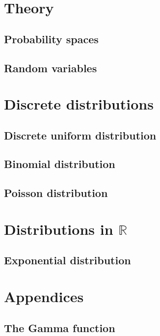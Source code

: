 \documentclass[12pt]{book}
\theoremstyle{plain}
\theoremstyle{definition}
\theoremstyle{remark}
\newcommand{\R}{\mathbb{R}} %
\begin{document}
	\tableofcontents
	
	\part{Theory}

	\chapter{Probability spaces}
	
	
	\chapter{Random variables}
	
	
	\part{Discrete distributions}

	\chapter{Discrete uniform distribution}
	
	
	\chapter{Binomial distribution}
	

	\chapter{Poisson distribution}
	

	\part{Distributions in \texorpdfstring{$\R$}{R}}

	\chapter{Exponential distribution}
	

	\part{Appendices}

	\appendix
	\chapter{The Gamma function}
	
	
	\printbibliography
\end{document}
